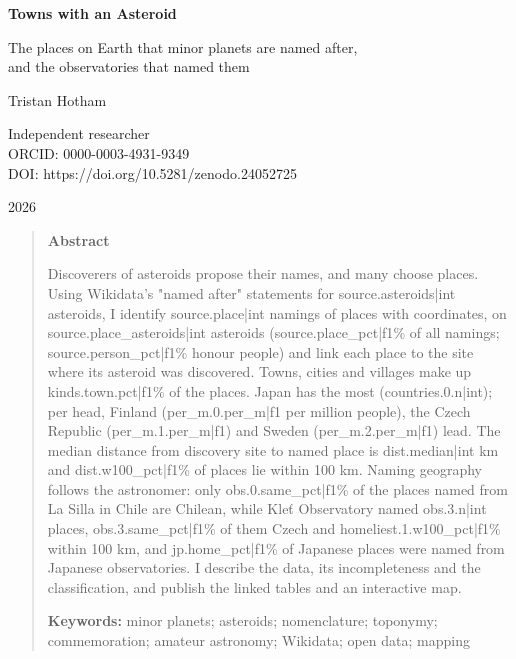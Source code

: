 \documentclass[11pt,a4paper]{article}
\begin{document}
\begin{center}
{\Large\bfseries Towns with an Asteroid\par}
\vspace{0.4em}
{\large The places on Earth that minor planets are named after,\\and the observatories that named them\par}
\vspace{1.2em}
{\large Tristan Hotham\par}
\vspace{0.3em}
{\small Independent researcher\\
ORCID: 0000-0003-4931-9349\\
DOI: https://doi.org/10.5281/zenodo.24052725\par}
\vspace{0.8em}
2026
\end{center}

\begin{quote}
\small
\begin{center}\textbf{Abstract}\end{center}
Discoverers of asteroids propose their names, and many choose places. Using Wikidata's "named after" statements for {{source.asteroids|int}} asteroids, I identify {{source.place|int}} namings of places with coordinates, on {{source.place_asteroids|int}} asteroids ({{source.place_pct|f1}}\% of all namings; {{source.person_pct|f1}}\% honour people) and link each place to the site where its asteroid was discovered. Towns, cities and villages make up {{kinds.town.pct|f1}}\% of the places. Japan has the most ({{countries.0.n|int}}); per head, Finland ({{per_m.0.per_m|f1}} per million people), the Czech Republic ({{per_m.1.per_m|f1}}) and Sweden ({{per_m.2.per_m|f1}}) lead. The median distance from discovery site to named place is {{dist.median|int}} km and {{dist.w100_pct|f1}}\% of places lie within 100 km. Naming geography follows the astronomer: only {{obs.0.same_pct|f1}}\% of the places named from La Silla in Chile are Chilean, while Kle\v{t} Observatory named {{obs.3.n|int}} places, {{obs.3.same_pct|f1}}\% of them Czech and {{homeliest.1.w100_pct|f1}}\% within 100 km, and {{jp.home_pct|f1}}\% of Japanese places were named from Japanese observatories. I describe the data, its incompleteness and the classification, and publish the linked tables and an interactive map.

\textbf{Keywords:} minor planets; asteroids; nomenclature; toponymy; commemoration; amateur astronomy; Wikidata; open data; mapping
\end{quote}
\end{document}
